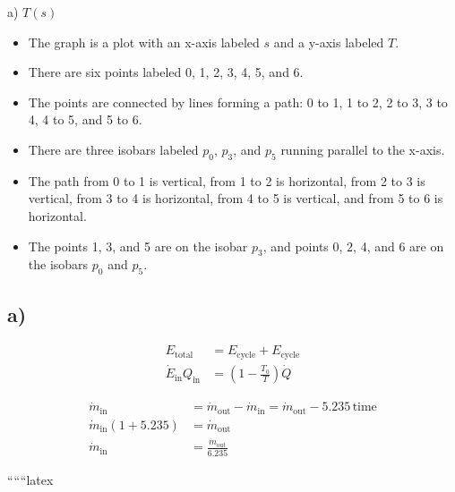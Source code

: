a) \( T(s) \)

\begin{itemize}
    \item The graph is a plot with an x-axis labeled \( s \) and a y-axis labeled \( T \).
    \item There are six points labeled 0, 1, 2, 3, 4, 5, and 6.
    \item The points are connected by lines forming a path: 0 to 1, 1 to 2, 2 to 3, 3 to 4, 4 to 5, and 5 to 6.
    \item There are three isobars labeled \( p_0 \), \( p_3 \), and \( p_5 \) running parallel to the x-axis.
    \item The path from 0 to 1 is vertical, from 1 to 2 is horizontal, from 2 to 3 is vertical, from 3 to 4 is horizontal, from 4 to 5 is vertical, and from 5 to 6 is horizontal.
    \item The points 1, 3, and 5 are on the isobar \( p_3 \), and points 0, 2, 4, and 6 are on the isobars \( p_0 \) and \( p_5 \).
\end{itemize}



\subsection*{a)}

\begin{align*}
    E_{\text{total}} &= E_{\text{cycle}} + E_{\text{cycle}} \\
    \dot{E}_\text{in} Q_\text{in} &= \left(1 - \frac{T_0}{T}\right) \dot{Q}
\end{align*}


\begin{align*}
    \dot{m}_\text{in} &= \dot{m}_\text{out} - \dot{m}_\text{in} = \dot{m}_\text{out} - 5.235 \, \text{time} \\
    \dot{m}_\text{in} \left(1 + 5.235\right) &= \dot{m}_\text{out} \\
    \dot{m}_\text{in} &= \frac{\dot{m}_\text{out}}{6.235}
\end{align*}

``````latex